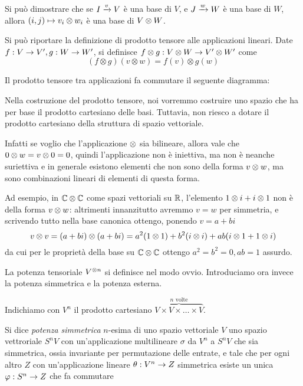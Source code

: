   Si può dimostrare che se $I \xrightarrow v V$ è una base di $V$, e $J \xrightarrow w W$ è una base di $W$, allora $(i,j) \mapsto v_i \otimes w_i$ è una base di $V\otimes W$.

  \begin{mydef}
    Si può riportare la definizione di prodotto tensore alle applicazioni lineari. Date $f:V \rightarrow V', g: W \rightarrow W'$, si definisce $f\otimes g: V\otimes W \rightarrow V'\otimes W'$ come
      \[
	(f \otimes g)(v\otimes w)=f(v)\otimes g(w) 
      \]
    
    Il prodotto tensore tra applicazioni fa commutare il seguente diagramma:
    
   
   \end{mydef}

  \begin{myobs}
   Nella costruzione del prodotto tensore, noi vorremmo costruire uno spazio che ha per base il prodotto cartesiano delle basi. Tuttavia, non riesco a dotare il prodotto cartesiano della struttura di spazio vettoriale.
   
   Infatti se voglio che l'applicazione $\otimes$ sia bilineare, allora vale che $0 \otimes w = v \otimes 0 = 0$, quindi l'applicazione non è iniettiva, ma non è neanche suriettiva e in generale esistono elementi che non sono della forma $v \otimes w$, ma sono combinazioni lineari di elementi di questa forma.
  \end{myobs}
  \begin{myexample}
  
   Ad esempio, in $\mathbb C \otimes \mathbb C$ come spazi vettoriali su $\mathbb R$, l'elemento $1 \otimes i + i \otimes 1$ non è della forma $v\otimes w$: altrimenti innanzitutto avremmo $v=w$ per simmetria, e scrivendo tutto nella base canonica ottengo, ponendo $v=a+bi$
   \[
    v\otimes v= (a+bi)\otimes (a+bi) = a^2(1\otimes 1) + b^2 (i\otimes i) + ab(i\otimes 1 +1\otimes i)
   \]
   da cui per le proprietà della base su $\mathbb C\otimes \mathbb C$ ottengo $a^2=b^2=0, ab=1$ assurdo.

  \end{myexample}
  
  La potenza tensoriale $V^{\otimes n}$ si definisce nel modo ovvio. Introduciamo ora invece la potenza simmetrica e la potenza esterna.
   
  \begin{mydef}
   Indichiamo con $V^n$ il prodotto cartesiano $\overbrace{V \times V \times \dots \times V}^{n \textrm{ volte}}$.
   
   Si dice \emph{potenza simmetrica} $n$-esima di uno spazio vettoriale $V$ uno spazio vettroriale $S^nV$ con un'applicazione multilineare $\sigma$ da $V^n$ a $S^nV$ che sia simmetrica, ossia invariante per permutazione delle entrate, e tale che per ogni altro $Z$ con un'applicazione lineare $\theta: V^n \rightarrow Z$ simmetrica esiste un unica $\varphi: S^n \rightarrow Z$ che fa commutare 
   
  
  \end{mydef}

